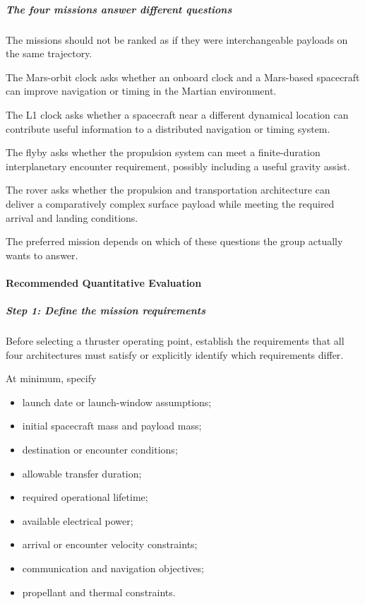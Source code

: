 \subparagraph{The four missions answer different questions}

The missions should not be ranked as if they were interchangeable
payloads on the same trajectory.

The Mars-orbit clock asks whether an onboard clock and a
Mars-based spacecraft can improve navigation or timing in
the Martian environment.

The L1 clock asks whether a spacecraft near a different
dynamical location can contribute useful information to a
distributed navigation or timing system.

The flyby asks whether the propulsion system can meet a
finite-duration interplanetary encounter requirement, possibly
including a useful gravity assist.

The rover asks whether the propulsion and transportation
architecture can deliver a comparatively complex surface
payload while meeting the required arrival and landing
conditions.

The preferred mission depends on which of these questions
the group actually wants to answer.

\paragraph{Recommended Quantitative Evaluation}

\subparagraph{Step 1: Define the mission requirements}

Before selecting a thruster operating point, establish the
requirements that all four architectures must satisfy or
explicitly identify which requirements differ.

At minimum, specify

\begin{itemize}
	\item launch date or launch-window assumptions;
	\item initial spacecraft mass and payload mass;
	\item destination or encounter conditions;
	\item allowable transfer duration;
	\item required operational lifetime;
	\item available electrical power;
	\item arrival or encounter velocity constraints;
	\item communication and navigation objectives;
	\item propellant and thermal constraints.
\end{itemize}

